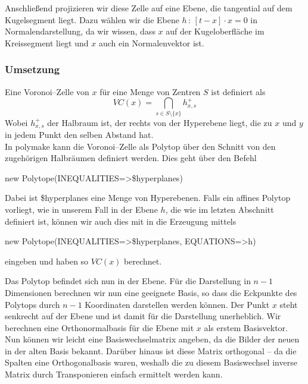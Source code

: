            Anschließend projizieren wir diese Zelle auf eine Ebene, die tangential auf dem Kugelsegment liegt. Dazu wählen wir die Ebene $h \, : \, [t - x] \cdot x = 0$ in Normalendarstellung, da wir wissen, dass $x$ auf der Kugeloberfläche im Kreissegment liegt und $x$ auch ein Normalenvektor ist.
            
        \subsubsection*{Umsetzung}
         Eine Voronoi--Zelle von $x$ für eine Menge von Zentren $S$ ist definiert als 
         $$ VC(x) = \bigcap_{s \in S \setminus \{ x \}} h^+_{x,s}$$
         Wobei $h^+_{x,s}$ der Halbraum ist, der rechts von der Hyperebene liegt, die zu $x$ und $y$ in jedem Punkt den selben Abstand hat.\\
         
         \noindent In polymake kann die Voronoi--Zelle als Polytop über den Schnitt von den zugehörigen Halbräumen definiert werden. Dies geht über den Befehl

         \begin{code}
            new Polytope(INEQUALITIES=>\$hyperplanes)
         \end{code}

         Dabei ist \$hyperplanes eine Menge von Hyperebenen. Falls ein affines Polytop vorliegt, wie in unserem Fall in der Ebene $h$, die wie im letzten Abschnitt
         definiert ist, können wir auch dies mit in die Erzeugung mittels

         \begin{code}
new Polytope(INEQUALITIES=>\$hyperplanes, EQUATIONS=>{h})
         \end{code}

         eingeben und haben so $VC(x)$ berechnet. 
         
         \noindent Das Polytop befindet sich nun in der Ebene. Für die Darstellung in $n-1$ Dimensionen berechnen wir nun eine geeignete Basis, so dass die Eckpunkte des Polytops durch $n-1$ Koordinaten darstellen werden können. 
         Der Punkt $x$ steht senkrecht auf der Ebene und ist damit für die Darstellung 
         unerheblich. Wir berechnen eine Orthonormalbasis für die Ebene mit $x$ als erstem Basisvektor. Nun können wir leicht eine Basiswechselmatrix angeben,
         da die Bilder der neuen in der alten Basis bekannt. Darüber hinaus ist diese Matrix orthogonal -- da die Spalten eine Orthogonalbasis waren, weshalb die zu diesem Basiswechsel inverse Matrix durch Transponieren einfach ermittelt werden kann.

